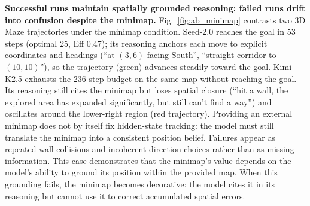 \documentclass{llmxive}
\begin{document}
\noindent\textbf{Successful runs maintain spatially grounded reasoning; failed runs drift into confusion despite the minimap.}\label{sec:appendix_viz_minimap}
Fig.~\ref{fig:ab_minimap} contrasts two 3D Maze trajectories under the minimap condition. Seed-2.0 reaches the goal in 53 steps (optimal 25, Eff 0.47); its reasoning anchors each move to explicit coordinates and headings (``at $(3,6)$ facing South'', ``straight corridor to $(10,10)$''), so the trajectory (green) advances steadily toward the goal. Kimi-K2.5 exhausts the 236-step budget on the same map without reaching the goal. Its reasoning still cites the minimap but loses spatial closure (``hit a wall, the explored area has expanded significantly, but still can't find a way'') and oscillates around the lower-right region (red trajectory). Providing an external minimap does not by itself fix hidden-state tracking: the model must still translate the minimap into a consistent position belief. Failures appear as repeated wall collisions and incoherent direction choices rather than as missing information. This case demonstrates that the minimap's value depends on the model's ability to ground its position within the provided map. When this grounding fails, the minimap becomes decorative: the model cites it in its reasoning but cannot use it to correct accumulated spatial errors.
\end{document}
